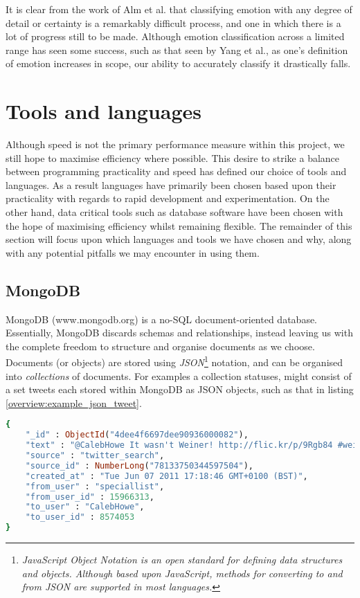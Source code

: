 It is clear from the work of Alm et al. \cite{Alm:2005vc} that classifying emotion with any degree of detail or certainty is a remarkably difficult process, and one in which there is a lot of progress still to be made. Although emotion classification across a limited range has seen some success, such as that seen by Yang et al., as one's definition of emotion increases in scope, our ability to accurately classify it drastically falls.

\section{Tools and languages}
\label{background:tools}

Although speed is not the primary performance measure within this project, we still hope to maximise efficiency where possible. This desire to strike a balance between programming practicality and speed has defined our choice of tools and languages. As a result languages have primarily been chosen based upon their practicality with regards to rapid development and experimentation. On the other hand, data critical tools such as database software have been chosen with the hope of maximising efficiency whilst remaining flexible. The remainder of this section will focus upon which languages and tools we have chosen and why, along with any potential pitfalls we may encounter in using them.

\subsection{MongoDB}

MongoDB (www.mongodb.org) is a no-SQL document-oriented database. Essentially, MongoDB discards schemas and relationships, instead leaving us with the complete freedom to structure and organise documents as we choose. Documents (or objects) are stored using \emph{JSON}\footnote{\emph{JavaScript Object Notation is an open standard for defining data structures and objects. Although based upon JavaScript, methods for converting to and from JSON are supported in most languages.}} notation, and can be organised into \emph{collections} of documents. For examples a collection statuses, might consist of a set tweets each stored within MongoDB as JSON objects, such as that in listing \ref{overview:example_json_tweet}.

\begin{lstlisting}[language=Ruby, caption={Example tweet stored within MongoDB}, label=overview:example_json_tweet]
{
	"_id" : ObjectId("4dee4f6697dee90936000082"),
	"text" : "@CalebHowe It wasn't Weiner! http://flic.kr/p/9Rgb84 #weinergate",
	"source" : "twitter_search",
	"source_id" : NumberLong("78133750344597504"),
	"created_at" : "Tue Jun 07 2011 17:18:46 GMT+0100 (BST)",
	"from_user" : "speciallist",
	"from_user_id" : 15966313,
	"to_user" : "CalebHowe",
	"to_user_id" : 8574053
}
\end{lstlisting}

